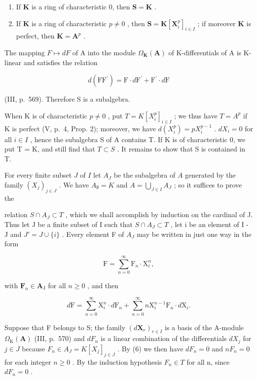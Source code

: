 \begin{enumerate}
\def\labelenumi{\alph{enumi})}
\item
  If \(\mathbf{K}\) is a ring of characteristic 0, then \(\mathbf{S} = \mathbf{K}\) .
\item
  If \(\mathbf{K}\) is a ring of characteristic \(p \neq 0\) , then \(\mathbf{S} = \mathbf{K}[\mathbf{X}_i^p]_{i \in I}\) ; if moreover \(\mathbf{K}\) is perfect, then \(\mathbf{K} = \mathbf{A}^p\) .
\end{enumerate}

The mapping \(F \mapsto dF\) of A into the module \(\Omega_{\mathbf{K}}(\mathbf{A})\) of K-differentials of A is K-linear and satisfies the relation

\[
d \left(\mathrm{FF} ^ {\prime}\right) = \mathrm{F} \cdot d \mathrm{F} ^ {\prime} + \mathrm{F} ^ {\prime} \cdot d \mathrm{F}
\]

(III, p.~569). Therefore S is a subalgebra.

When K is of characteristic \(p \neq 0\) , put \(T = K[X_{i}^{p}]_{i \in I}\) ; we thus have \(T = A^{p}\) if K is perfect (V, p.~4, Prop. 2); moreover, we have \(d(X_{i}^{p}) = pX_{i}^{p-1}\) . \(dX_{i} = 0\) for all \(i \in I\) , hence the subalgebra S of A contains T. If K is of characteristic 0, we put T = K, and still find that \(T \subset S\) . It remains to show that S is contained in T.

For every finite subset \(J\) of \(I\) let \(A_{J}\) be the subalgebra of \(A\) generated by the family \((X_{j})_{j\in J}\) . We have \(A_{\emptyset} = K\) and \(A = \bigcup_{J\in I}A_{J}\) ; so it suffices to prove the

relation \(S \cap A_{J} \subset T\) , which we shall accomplish by induction on the cardinal of J. Thus let J be a finite subset of I such that \(S \cap A_{J} \subset T\) , let i be an element of I - J and \(J' = J \cup \{i\}\) . Every element F of \(A_{J}\) may be written in just one way in the form

\[
\mathrm{F} = \sum_ {n = 0} ^ {\infty} \mathrm{F} _ {n} \cdot \mathrm{X} _ {i} ^ {n},\tag{5}
\]

with \(\mathbf{F}_n\in \mathbf{A}_{\mathrm{J}}\) for all \(n\geqslant 0\) , and then

\[
d \mathrm{F} = \sum_ {n = 0} ^ {\infty} \mathrm{X} _ {i} ^ {n} \cdot d \mathrm{F} _ {n} + \sum_ {n = 0} ^ {\infty} n \mathrm{X} _ {i} ^ {n - 1} \mathrm{F} _ {n} \cdot d \mathrm{X} _ {i}.\tag{6}
\]

Suppose that F belongs to S; the family \((d\mathbf{X}_{r})_{r\in I}\) is a basis of the A-module \(\Omega_{\mathrm{K}}(\mathbf{A})\) (III, p.~570) and \(dF_{n}\) is a linear combination of the differentials \(dX_{j}\) for \(j\in J\) because \(F_{n}\in A_{J}=K[X_{j}]_{j\in J}\) . By (6) we then have \(dF_{n}=0\) and \(nF_{n}=0\) for each integer \(n\geqslant0\) . By the induction hypothesis \(F_{n}\in T\) for all n, since \(dF_{n}=0\) .

